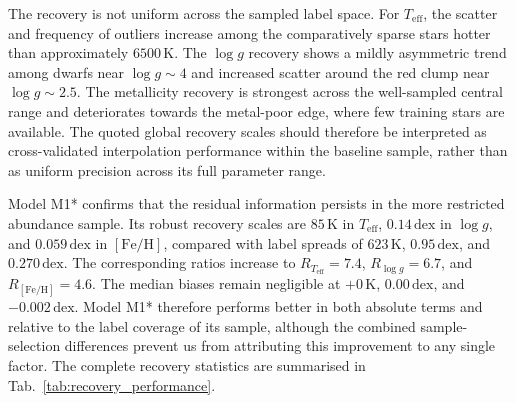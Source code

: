 \documentclass[twocolumn,apj,numberedappendix,appendixfloats]{openjournal}
\begin{document}
The recovery is not uniform across the sampled label space. For $T_\mathrm{eff}$, the scatter and frequency of outliers increase among the comparatively sparse stars hotter than approximately $6500\,\mathrm{K}$. The $\log g$ recovery shows a mildly asymmetric trend among dwarfs near $\log g\sim4$ and increased scatter around the red clump near $\log g\sim2.5$. The metallicity recovery is strongest across the well-sampled central range and deteriorates towards the metal-poor edge, where few training stars are available. The quoted global recovery scales should therefore be interpreted as cross-validated interpolation performance within the baseline sample, rather than as uniform precision across its full parameter range.

Model \textcolor{M1}{M1*} confirms that the residual information persists in the more restricted abundance sample. Its robust recovery scales are $85\,\mathrm{K}$ in $T_\mathrm{eff}$, $0.14\,\mathrm{dex}$ in $\log g$, and $0.059\,\mathrm{dex}$ in $[\mathrm{Fe/H}]$, compared with label spreads of $623\,\mathrm{K}$, $0.95\,\mathrm{dex}$, and $0.270\,\mathrm{dex}$. The corresponding ratios increase to $R_{T_\mathrm{eff}}=7.4$, $R_{\log g}=6.7$, and $R_{[\mathrm{Fe/H}]}=4.6$. The median biases remain negligible at $+0\,\mathrm{K}$, $0.00\,\mathrm{dex}$, and $-0.002\,\mathrm{dex}$. Model \textcolor{M1}{M1*} therefore performs better in both absolute terms and relative to the label coverage of its sample, although the combined sample-selection differences prevent us from attributing this improvement to any single factor. The complete recovery statistics are summarised in Tab.~\ref{tab:recovery_performance}.
\end{document}
